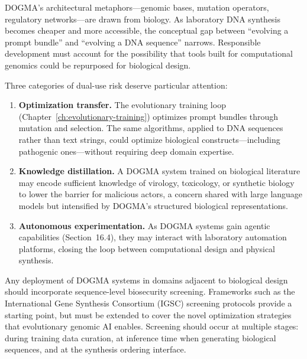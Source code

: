 \begin{keyinsight}
DOGMA's architectural metaphors---genomic bases, mutation operators, regulatory networks---are drawn from biology.
As laboratory DNA synthesis becomes cheaper and more accessible, the conceptual gap between ``evolving a prompt bundle'' and ``evolving a DNA sequence'' narrows.
Responsible development must account for the possibility that tools built for computational genomics could be repurposed for biological design.
\end{keyinsight}

Three categories of dual-use risk deserve particular attention:

\begin{enumerate}[leftmargin=1.8em]
  \item \textbf{Optimization transfer.} The evolutionary training loop (Chapter~\ref{ch:evolutionary-training}) optimizes prompt bundles through mutation and selection. The same algorithms, applied to DNA sequences rather than text strings, could optimize biological constructs---including pathogenic ones---without requiring deep domain expertise.

  \item \textbf{Knowledge distillation.} A DOGMA system trained on biological literature may encode sufficient knowledge of virology, toxicology, or synthetic biology to lower the barrier for malicious actors, a concern shared with large language models but intensified by DOGMA's structured biological representations.

  \item \textbf{Autonomous experimentation.} As DOGMA systems gain agentic capabilities (Section~16.4), they may interact with laboratory automation platforms, closing the loop between computational design and physical synthesis.
\end{enumerate}

\begin{implnote}
Any deployment of DOGMA systems in domains adjacent to biological design should incorporate sequence-level biosecurity screening.
Frameworks such as the International Gene Synthesis Consortium (IGSC) screening protocols provide a starting point, but must be extended to cover the novel optimization strategies that evolutionary genomic AI enables.
Screening should occur at multiple stages: during training data curation, at inference time when generating biological sequences, and at the synthesis ordering interface.
\end{implnote}

